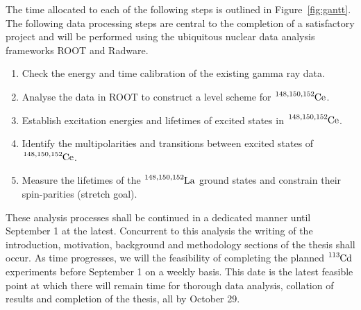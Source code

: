 \documentclass[12pt,a4paper]{article}
\begin{document}
\medskip
\noindent
The time allocated to each of the following steps is outlined in Figure~\ref{fig:gantt}.
The following data processing steps are central to the completion of a satisfactory project and will be performed using the ubiquitous nuclear data analysis frameworks ROOT and Radware.
\begin{enumerate}
\item Check the energy and time calibration of the existing gamma ray data.
\item Analyse the data in ROOT to construct a level scheme for $\ce{^{148,150,152}Ce}$.
\item Establish excitation energies and lifetimes of excited states in $\ce{^{148,150,152}Ce}$.
\item Identify the multipolarities and transitions between excited states of $\ce{^{148,150,152}Ce}$.
\item Measure the lifetimes of the $\ce{^{148,150,152}La}$ ground states and constrain their spin-parities (stretch goal).
\end{enumerate}

\medskip
\noindent
These analysis processes shall be continued in a dedicated manner until September 1 at the latest.
Concurrent to this analysis the writing of the introduction, motivation, background and methodology sections of the thesis shall occur. 
As time progresses, we will the feasibility of completing the planned $\ce{^{113}Cd}$ experiments before September 1 on a weekly basis.
This date is the latest feasible point at which there will remain time for thorough data analysis, collation of results and completion of the thesis, all by October 29.
\end{document}
